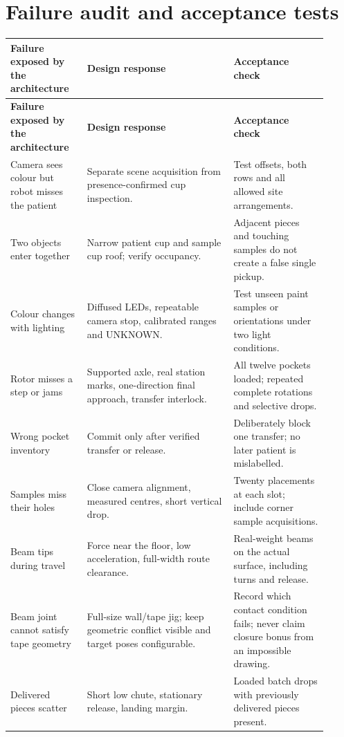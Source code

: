\documentclass[10pt,a4paper]{article}
\begin{document}
\clearpage
{}\section{Failure audit and acceptance tests}
\small\begin{longtable}{@{}>{\raggedright\arraybackslash}p{0.22\linewidth}>{\raggedright\arraybackslash}p{0.42\linewidth}>{\raggedright\arraybackslash}p{0.27\linewidth}@{}}
\toprule
\textbf{Failure exposed by the architecture} & \textbf{Design response} & \textbf{Acceptance check} \\
\midrule\endfirsthead
\toprule\textbf{Failure exposed by the architecture} & \textbf{Design response} & \textbf{Acceptance check} \\\midrule\endhead
Camera sees colour but robot misses the patient & Separate scene acquisition from presence-confirmed cup inspection. & Test offsets, both rows and all allowed site arrangements. \\[3pt]
Two objects enter together & Narrow patient cup and sample cup roof; verify occupancy. & Adjacent pieces and touching samples do not create a false single pickup. \\[3pt]
Colour changes with lighting & Diffused LEDs, repeatable camera stop, calibrated ranges and UNKNOWN. & Test unseen paint samples or orientations under two light conditions. \\[3pt]
Rotor misses a step or jams & Supported axle, real station marks, one-direction final approach, transfer interlock. & All twelve pockets loaded; repeated complete rotations and selective drops. \\[3pt]
Wrong pocket inventory & Commit only after verified transfer or release. & Deliberately block one transfer; no later patient is mislabelled. \\[3pt]
Samples miss their holes & Close camera alignment, measured centres, short vertical drop. & Twenty placements at each slot; include corner sample acquisitions. \\[3pt]
Beam tips during travel & Force near the floor, low acceleration, full-width route clearance. & Real-weight beams on the actual surface, including turns and release. \\[3pt]
Beam joint cannot satisfy tape geometry & Full-size wall/tape jig; keep geometric conflict visible and target poses configurable. & Record which contact condition fails; never claim closure bonus from an impossible drawing. \\[3pt]
Delivered pieces scatter & Short low chute, stationary release, landing margin. & Loaded batch drops with previously delivered pieces present. \\[3pt]

\end{longtable}
\end{document}
